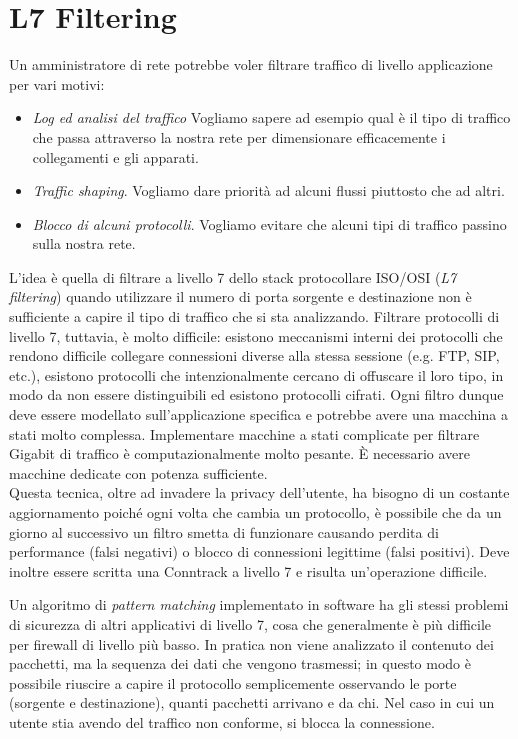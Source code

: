 \section{L7 Filtering}
Un amministratore di rete potrebbe voler filtrare traffico di livello applicazione per vari motivi:
\begin{itemize}
	\item \textit{Log ed analisi del traffico} Vogliamo sapere ad esempio qual è il tipo di traffico che passa attraverso la nostra rete per dimensionare efficacemente i collegamenti e gli apparati.
	\item \textit{Traffic shaping}. Vogliamo dare priorità ad alcuni flussi piuttosto che ad altri.
	\item \textit{Blocco di alcuni protocolli}. Vogliamo evitare che alcuni tipi di traffico passino sulla nostra rete.
\end{itemize}
L'idea è quella di filtrare a livello 7 dello stack protocollare ISO/OSI (\textit{L7 filtering}) quando utilizzare il numero di porta sorgente e destinazione non è sufficiente a capire il tipo di traffico che si sta analizzando. Filtrare protocolli di livello 7, tuttavia, è molto difficile: esistono meccanismi interni dei protocolli che rendono difficile collegare connessioni diverse alla stessa sessione (e.g. FTP, SIP, etc.), esistono protocolli che intenzionalmente cercano di offuscare il loro tipo, in modo da non essere distinguibili ed esistono protocolli cifrati. Ogni filtro dunque deve essere modellato sull'applicazione specifica e potrebbe avere una macchina a stati molto complessa. Implementare macchine a stati complicate per filtrare Gigabit di traffico è computazionalmente molto pesante. È necessario avere macchine dedicate con potenza sufficiente.\\
Questa tecnica, oltre ad invadere la privacy dell'utente, ha bisogno di un costante aggiornamento poiché ogni volta che cambia un protocollo, è possibile che da un giorno al successivo un filtro smetta di funzionare causando perdita di performance (falsi negativi) o blocco di connessioni legittime (falsi positivi). Deve inoltre essere scritta una Conntrack  a livello 7 e risulta un'operazione difficile.

Un algoritmo di \textit{pattern matching} implementato in software ha gli stessi problemi di sicurezza di altri applicativi di livello 7, cosa che generalmente è più difficile per firewall di livello più basso. In pratica non viene analizzato il contenuto dei pacchetti, ma la sequenza dei dati che vengono trasmessi; in questo modo è possibile riuscire a capire il protocollo semplicemente osservando le porte (sorgente e destinazione), quanti pacchetti arrivano e da chi. Nel caso in cui un utente stia avendo del traffico non conforme, si blocca la connessione.

